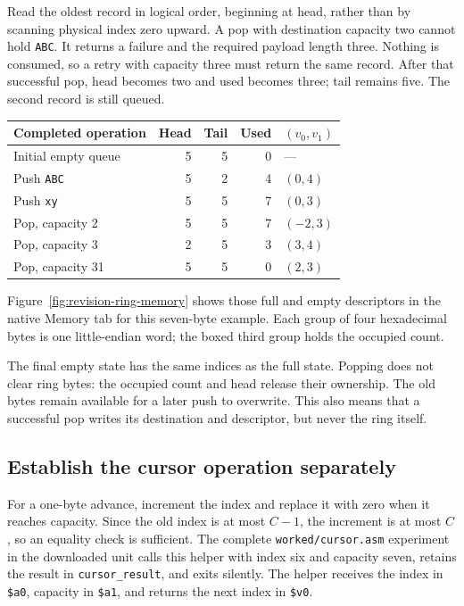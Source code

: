 

Read the oldest record in logical order, beginning at head, rather than by scanning
physical index zero upward. A pop with destination capacity two cannot hold
\texttt{ABC}. It returns a failure and the required payload length three. Nothing
is consumed, so a retry with capacity three must return the same record. After
that successful pop, head becomes two and used becomes three; tail remains five.
The second record is still queued.

\begin{center}
  \begin{tabular}{lrrrl}
    \toprule
    Completed operation & Head & Tail & Used & $(v_0,v_1)$ \\
    \midrule
    Initial empty queue & 5    & 5    & 0    & ---         \\
    Push \texttt{ABC}   & 5    & 2    & 4    & $(0,4)$     \\
    Push \texttt{xy}    & 5    & 5    & 7    & $(0,3)$     \\
    Pop, capacity 2     & 5    & 5    & 7    & $(-2,3)$    \\
    Pop, capacity 3     & 2    & 5    & 3    & $(3,4)$     \\
    Pop, capacity 31    & 5    & 5    & 0    & $(2,3)$     \\
    \bottomrule
  \end{tabular}
\end{center}

Figure~\ref{fig:revision-ring-memory} shows those full and empty descriptors in the
native Memory tab for this seven-byte example. Each group of four hexadecimal
bytes is one little-endian word; the boxed third group holds the occupied count.



The final empty state has the same indices as the full state. Popping does not
clear ring bytes: the occupied count and head release their ownership. The old
bytes remain available for a later push to overwrite. This also means that a
successful pop writes its destination and descriptor, but never the ring itself.

\subsection*{Establish the cursor operation separately}

For a one-byte advance, increment the index and replace it with zero when it
reaches capacity. Since the old index is at most $C-1$, the increment is at most
$C$, so an equality check is sufficient. The complete \texttt{worked/cursor.asm}
experiment in the downloaded unit calls this helper with index six and
capacity seven, retains the result in \texttt{cursor\_result}, and exits silently.
The helper receives the index in \texttt{\$a0}, capacity in \texttt{\$a1}, and
returns the next index in \texttt{\$v0}.

